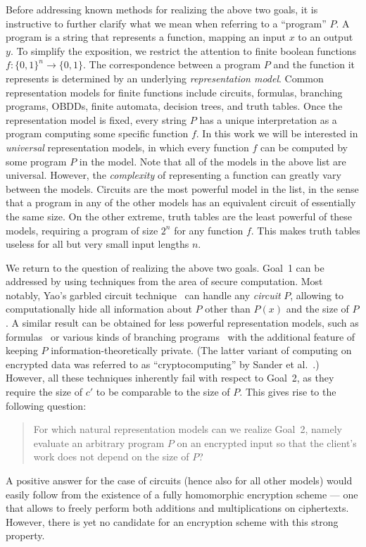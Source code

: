 \documentclass[11pt]{article}
\begin{document}
Before addressing known methods for realizing the above two
goals, it is instructive to further clarify what we mean when
referring to a ``program'' $P$. A program is a string that
represents a function, mapping an input $x$ to an output $y$. To
simplify the exposition, we restrict the attention to finite
boolean functions $f:\{0,1\}^n\to\{0,1\}$. The correspondence
between a program $P$ and the function it represents is
determined by an underlying {\em representation model}. Common
representation models for finite functions include circuits,
formulas, branching programs, OBDDs, finite automata, decision
trees, and truth tables. Once the representation model is fixed,
every string $P$ has a unique interpretation as a program
computing some specific function $f$. In this work we will be
interested in {\em universal} representation models, in which
every function $f$ can be computed by some program $P$ in the
model. Note that all of the models in the above list are
universal.  However, the {\em complexity} of representing a
function can greatly vary between the models.
Circuits are the most powerful model in the list, in the sense
that a program in any of the other models has an equivalent
circuit of essentially the same size. On the other extreme,
truth tables are the least powerful of these models, requiring
a program of size $2^n$ for any function $f$. This makes truth
tables useless for all but very small input lengths $n$.

We return to the question of realizing the above two goals. Goal~1
can be addressed by using techniques from the area of secure
computation.  Most notably, Yao's garbled circuit
technique~\cite{Y86,CCKM00,LP} can handle any {\em circuit} $P$,
allowing to computationally hide all information about $P$ other
than $P(x)$ and the size of $P$. A similar result can be obtained
for less powerful representation models, such as
formulas~\cite{SYY99,Kil88,Kol} or various kinds of branching
programs~\cite{Bea00,FKN,IK00,Rap} with the additional feature of
keeping $P$ information-theoretically private. (The latter variant
of computing on encrypted data was referred to as
``cryptocomputing'' by Sander et al.~\cite{SYY99}.) However, all
these techniques inherently fail with respect to Goal~2, as they
require the size of $c'$ to be comparable to the size of $P$. This
gives rise to the following question:
\begin{quote}
For which natural representation models can we realize Goal~2,
namely evaluate an arbitrary program $P$ on an encrypted input
so that the client's work does not depend on the size of $P$?
\end{quote}
A positive answer for the case of circuits (hence also for all
other models) would easily follow from the existence of a fully
homomorphic encryption scheme --- one that allows to freely perform
both additions and multiplications on ciphertexts. However, there
is yet no candidate for an encryption scheme with this strong
property.
\end{document}

